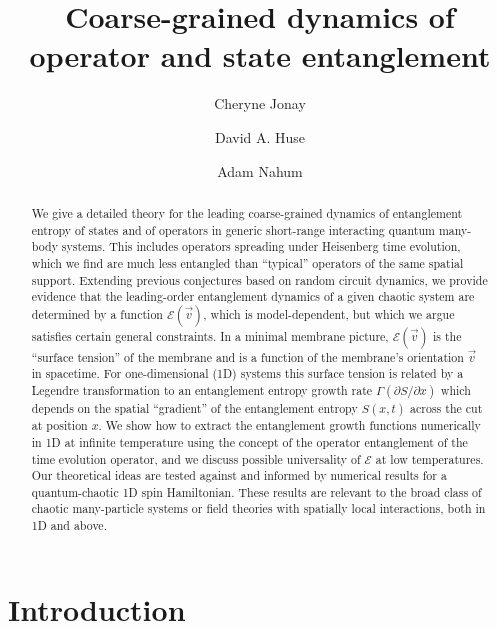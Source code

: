 \documentclass[aps,prx,twocolumn,superscriptaddress,floatfix,nofootinbib,prx]{revtex4}
\renewcommand{\>}{\right\rangle}
\newcommand{\<}{\left\langle}
\newcommand{\lt}{\mathcal{E}}
\begin{document}
\author{Cheryne Jonay}
\author{David A. Huse}
\author{Adam Nahum}

\title{
Coarse-grained dynamics of operator and state entanglement
}
\begin{abstract}
We give a detailed theory for the leading coarse-grained dynamics of entanglement entropy of states and of operators in generic  short-range interacting quantum many-body systems.
This includes operators spreading under Heisenberg time evolution, which we find are much less entangled than ``typical'' operators of the same spatial support. 
Extending previous conjectures based on random circuit dynamics, we provide evidence that the leading-order entanglement dynamics of a given chaotic system are  determined by a  function $\lt(\vec v)$, which is model-dependent, but which we argue  satisfies certain general constraints.
 In a minimal membrane picture,  $\lt(\vec v)$ is the ``surface tension'' of the membrane and is a function of the membrane's orientation $\vec v$ in spacetime.  For one-dimensional (1D) systems this surface tension is related by a Legendre transformation to an entanglement entropy growth rate  $\Gamma(\partial S/\partial x)$ which depends on the spatial ``gradient'' of the entanglement entropy $S(x,t)$ across the cut at position $x$.
We show how to extract the entanglement growth functions numerically in 1D at infinite temperature using the concept of the operator entanglement of the time evolution operator, and we discuss possible universality of $\lt$ at low temperatures.
Our theoretical ideas are tested against and informed by numerical results for a quantum-chaotic 1D spin Hamiltonian.
These results are relevant to the broad class of chaotic many-particle systems or field theories with spatially local interactions, both in 1D and above.

\end{abstract}

\maketitle

\section{Introduction}
\end{document}
